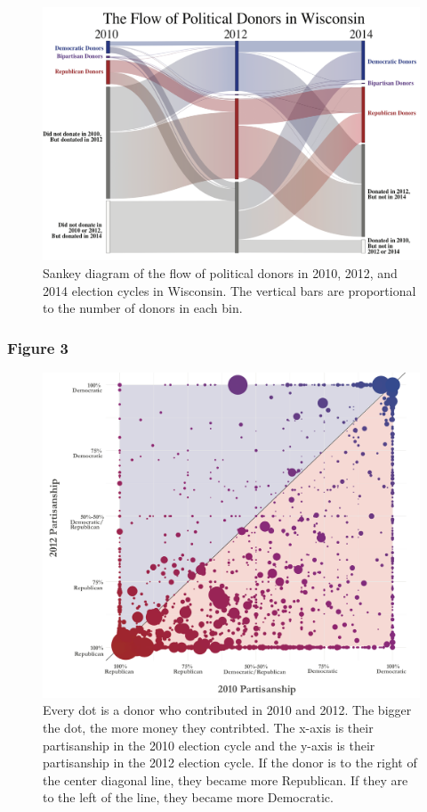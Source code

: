 \documentclass[12pt,]{article}
\begin{document}
\begin{figure}
\includegraphics[width=1\linewidth]{../figures/fig2} \caption{Sankey diagram of the flow of political donors in 2010, 2012, and 2014 election cycles in Wisconsin. The vertical bars are proportional to the number of donors in each bin.}\label{fig:unnamed-chunk-11}
\end{figure}

\newpage

\hypertarget{figure-3}{%
\subsubsection{Figure 3}\label{figure-3}}

\begin{figure}
\includegraphics[width=1\linewidth]{../figures/fig3} \caption{Every dot is a donor who contributed in 2010 and 2012. The bigger the dot, the more money they contribted. The x-axis is their partisanship in the 2010 election cycle and the y-axis is their partisanship in the 2012 election cycle. If the donor is to the right of the center diagonal line, they became more Republican. If they are to the left of the line, they became more Democratic.}\label{fig:unnamed-chunk-12}
\end{figure}
\end{document}
